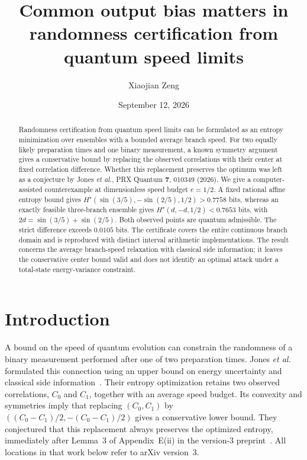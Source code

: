 \documentclass[aps,pra,reprint,amsmath,amssymb,longbibliography,nofootinbib]{revtex4-2}
\newcommand{\Hs}{H^{\star}}
\begin{document}
\title{Common output bias matters in randomness certification from quantum speed limits}
\author{Xiaojian Zeng}
\date{September 12, 2026}
\begin{abstract}
Randomness certification from quantum speed limits can be formulated as an
entropy minimization over ensembles with a bounded average branch speed.
For two equally likely preparation times and one binary measurement, a known
symmetry argument gives a conservative bound by replacing the observed
correlations with their center at fixed correlation difference. Whether this
replacement preserves the optimum was left as a conjecture by Jones
\textit{et al.}, PRX Quantum \textbf{7}, 010349 (2026).
We give a computer-assisted counterexample at dimensionless speed budget
$e=1/2$. A fixed rational affine entropy bound gives
$\Hs(\sin(3/5),-\sin(2/5),1/2)>0.7758$ bits, whereas an exactly feasible
three-branch ensemble gives $\Hs(d,-d,1/2)<0.7653$ bits, with
$2d=\sin(3/5)+\sin(2/5)$. Both observed points are quantum admissible.
The strict difference exceeds $0.0105$ bits. The certificate covers the entire
continuous branch domain and is reproduced with distinct interval arithmetic
implementations. The result concerns the average branch-speed relaxation with
classical side information; it leaves the conservative center bound valid and
does not identify an optimal attack under a total-state energy-variance constraint.
\end{abstract}
\maketitle

\section{Introduction}

A bound on the speed of quantum evolution can constrain the randomness of
a binary measurement performed after one of two preparation times.
Jones \textit{et al.} formulated this connection using an upper bound on
energy uncertainty and classical side information~\cite{JonesSpeed2026}.
Their entropy optimization retains two observed correlations, $C_0$ and $C_1$,
together with an average speed budget. Its convexity and symmetries imply
that replacing $(C_0,C_1)$ by
$((C_0-C_1)/2,-(C_0-C_1)/2)$ gives a conservative lower bound.
They conjectured that this replacement always preserves the optimized
entropy, immediately after Lemma~3 of Appendix~E(ii) in the version-3
preprint~\cite{JonesSpeed2026}. All locations in that work below refer to
arXiv version~3.
\end{document}
